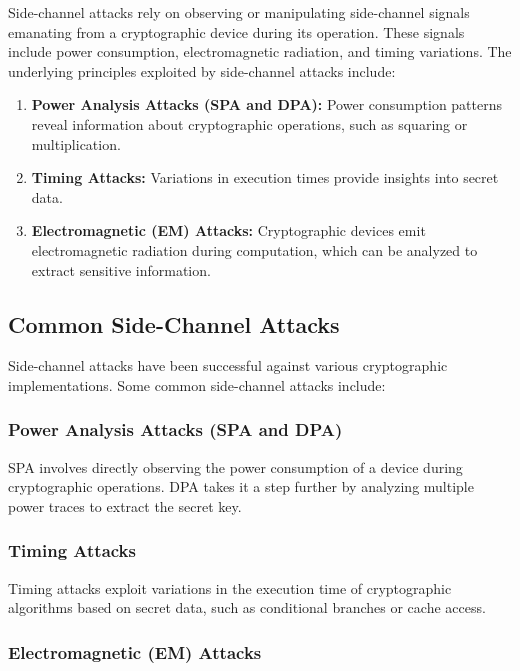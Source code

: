 \documentclass{article}
\begin{document}
Side-channel attacks rely on observing or manipulating side-channel signals emanating from a cryptographic device during its operation. These signals include power consumption, electromagnetic radiation, and timing variations. The underlying principles exploited by side-channel attacks include:

\begin{enumerate}
    \item \textbf{Power Analysis Attacks (SPA and DPA):} Power consumption patterns reveal information about cryptographic operations, such as squaring or multiplication.
    \item \textbf{Timing Attacks:} Variations in execution times provide insights into secret data.
    \item \textbf{Electromagnetic (EM) Attacks:} Cryptographic devices emit electromagnetic radiation during computation, which can be analyzed to extract sensitive information.
\end{enumerate}

\subsection{Common Side-Channel Attacks}

Side-channel attacks have been successful against various cryptographic implementations. Some common side-channel attacks include:

\subsubsection{Power Analysis Attacks (SPA and DPA)}

SPA involves directly observing the power consumption of a device during cryptographic operations. DPA takes it a step further by analyzing multiple power traces to extract the secret key.

\subsubsection{Timing Attacks}

Timing attacks exploit variations in the execution time of cryptographic algorithms based on secret data, such as conditional branches or cache access.

\subsubsection{Electromagnetic (EM) Attacks}
\end{document}
